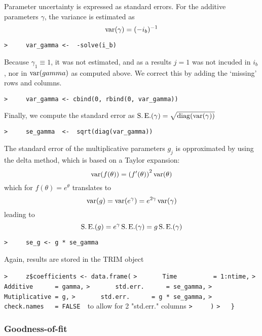 \documentclass[a4paper]{article}
\begin{document}
Parameter uncertainty is expressed as standard errors.
For the additive parameters $\gamma$, the variance is estimated as
$$ \operatorname{var}(\gamma) = (-i_b)^{-1} $$\par
\verb~>     var_gamma <-  -solve(i_b)~\par
Because $\gamma_1\equiv1$, it was not estimated, and as a results $j=1$ was not
incuded in $i_b$, nor in $\operatorname{var}(gamma)$ as computed above.
We correct this by adding the `missing' rows and columns.\par
\verb~>     var_gamma <- cbind(0, rbind(0, var_gamma))~\par
Finally, we compute the standard error as $\operatorname{S.E.}(\gamma) = \sqrt{\operatorname{diag}(\operatorname{var}(\gamma))}$\par
\verb~>     se_gamma  <-  sqrt(diag(var_gamma))~\par

The standard error of the multiplicative parameters $g_j$ is opproximated by
using the delta method, which is based on a Taylor expansion:
\begin{equation}
  \operatorname{var}(f(\theta)) = \left(f'(\theta)\right)^2 \operatorname{var}(\theta)
\end{equation}
which for $f(\theta)=e^\theta$ translates to
$$ \operatorname{var}(g) = \operatorname{var}(e^{\gamma}) = e^{2\gamma} \operatorname{var}(\gamma) $$
leading to
$$ \operatorname{S.E.}(g) = e^{\gamma} \operatorname{S.E.}(\gamma) = g \operatorname{S.E.}(\gamma) $$\par
\verb~>     se_g <- g * se_gamma~\par

Again, results are stored in the TRIM object\par
\verb~>     z$coefficients <- data.frame(~\newline
\verb~>       Time          = 1:ntime,~\newline
\verb~>       Additive      = gamma,~\newline
\verb~>       std.err.      = se_gamma,~\newline
\verb~>       Mutiplicative = g,~\newline
\verb~>       std.err.      = g * se_gamma,~\newline
\verb~>       check.names   = FALSE  ~{\sffamily to allow for 2 "std.err." columns}\newline
\verb~>     )~\newline
\verb~>   }~\par



\subsubsection{Goodness-of-fit}\par
\end{document}
